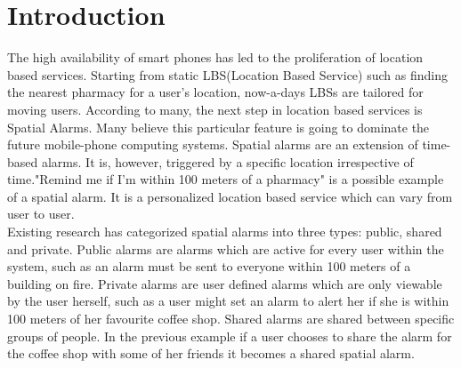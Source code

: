 
\chapter{Introduction}
\label{chap:intro}

The high availability of smart phones has led to the proliferation of location based services. Starting from static LBS(Location Based Service) such as finding the nearest pharmacy for a user's location, now-a-days LBSs are tailored for moving users. According to many, the next step in location based services is Spatial Alarms. Many believe this particular feature is going to dominate the future mobile-phone computing systems. Spatial alarms are an extension of time-based alarms. It is, however, triggered by a specific location irrespective of time."Remind me if I'm within 100 meters of a pharmacy" is a possible example of a spatial alarm. It is a personalized location based service which can vary from user to user.\\
 Existing research has categorized spatial alarms into three types: public, shared and private. Public alarms are alarms which are active for every user within the system, such as an alarm must be sent to everyone within 100 meters of a building on fire. Private alarms are user defined alarms which are only viewable by the user herself, such as a user might set an alarm to alert her if she is within 100 meters of her favourite coffee shop. Shared alarms are shared between specific groups of people. In the previous example if a user chooses to share the alarm for the coffee shop with some of her friends it becomes a shared spatial alarm.\\
\vspace*{10pt}



